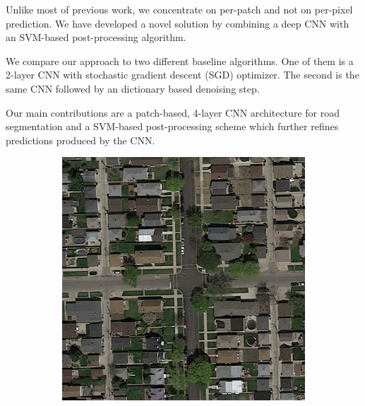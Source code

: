 \documentclass[10pt,conference,compsocconf]{IEEEtran}
\begin{document}
Unlike most of previous work, we concentrate on per-patch and not on per-pixel prediction. We have developed a novel solution by combining a deep CNN with an SVM-based post-processing algorithm.

We compare our approach to two different baseline algorithms. One of them is a 2-layer CNN with stochastic gradient descent (SGD) optimizer. The second is the same CNN followed by an dictionary based denoising \cite{Elad.2006} step.

Our main contributions are a patch-based, \mbox{4-layer} CNN architecture for road segmentation and a SVM-based post-processing scheme which further refines predictions produced by the CNN.

\begin{figure}
	\centering
	\begin{subfigure}{.2\textwidth}
		\includegraphics[width=1\textwidth]{figs/img1.png}
	\end{subfigure}
	\begin{subfigure}{.2\textwidth}

\end{subfigure}
\end{figure}
\end{document}
